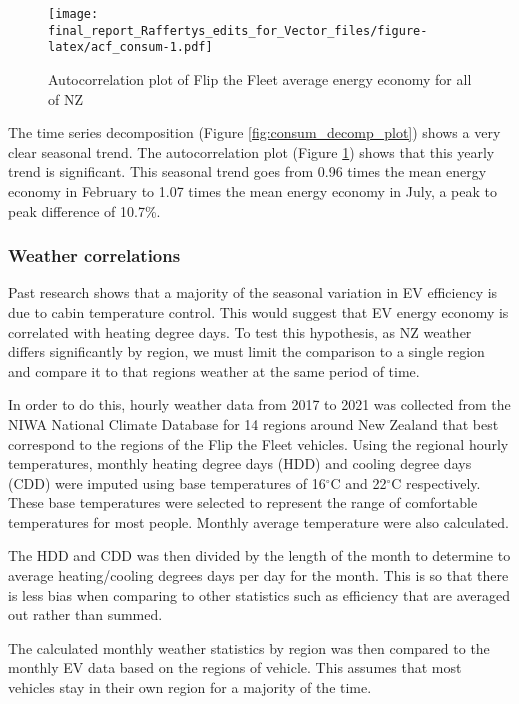 \documentclass[
]{article}
\begin{document}
\begin{figure}
\centering
\texttt{[image: final\_report\_Raffertys\_edits\_for\_Vector\_files/figure-latex/acf\_consum-1.pdf]}
\caption{Autocorrelation plot of Flip the Fleet average energy economy
for all of NZ\label{fig:acf_consum}}
\end{figure}

The time series decomposition (Figure \ref{fig:consum_decomp_plot})
shows a very clear seasonal trend. The autocorrelation plot (Figure
\ref{fig:acf_consum}) shows that this yearly trend is significant. This
seasonal trend goes from 0.96 times the mean energy economy in February
to 1.07 times the mean energy economy in July, a peak to peak difference
of 10.7\%.

\hypertarget{weather-correlations}{%
\subsubsection{Weather correlations}\label{weather-correlations}}

Past research shows that a majority of the seasonal variation in EV
efficiency is due to cabin temperature control\cite{ev_range}. This
would suggest that EV energy economy is correlated with heating degree
days. To test this hypothesis, as NZ weather differs significantly by
region, we must limit the comparison to a single region and compare it
to that regions weather at the same period of time.

In order to do this, hourly weather data from 2017 to 2021 was collected
from the NIWA National Climate Database for 14 regions around New
Zealand that best correspond to the regions of the Flip the Fleet
vehicles. Using the regional hourly temperatures, monthly heating degree
days (HDD) and cooling degree days (CDD) were imputed using base
temperatures of 16\(^\circ\)C and 22\(^\circ\)C respectively. These base
temperatures were selected to represent the range of comfortable
temperatures for most people. Monthly average temperature were also
calculated.

The HDD and CDD was then divided by the length of the month to determine
to average heating/cooling degrees days per day for the month. This is
so that there is less bias when comparing to other statistics such as
efficiency that are averaged out rather than summed.

The calculated monthly weather statistics by region was then compared to
the monthly EV data based on the regions of vehicle. This assumes that
most vehicles stay in their own region for a majority of the time.
\end{document}
